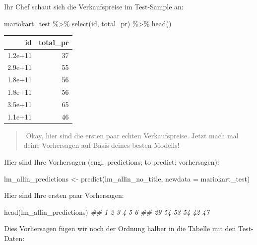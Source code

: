 \documentclass[
  letterpaper,
  twoside,
  open=any]{scrbook}
\newenvironment{Shaded}{\begin{snugshade}}{\end{snugshade}}
\newcommand{\AttributeTok}[1]{\textcolor[rgb]{0.40,0.45,0.13}{#1}}
\newcommand{\DocumentationTok}[1]{\textcolor[rgb]{0.37,0.37,0.37}{\textit{#1}}}
\newcommand{\FunctionTok}[1]{\textcolor[rgb]{0.28,0.35,0.67}{#1}}
\newcommand{\NormalTok}[1]{\textcolor[rgb]{0.00,0.23,0.31}{#1}}
\newcommand{\OtherTok}[1]{\textcolor[rgb]{0.00,0.23,0.31}{#1}}
\newcommand{\SpecialCharTok}[1]{\textcolor[rgb]{0.37,0.37,0.37}{#1}}
\theoremstyle{definition}
\theoremstyle{definition}
\theoremstyle{definition}
\theoremstyle{remark}
\begin{document}
Ihr Chef schaut sich die Verkaufspreise im Test-Sample an:

\begin{Shaded}
\begin{Highlighting}[]
\NormalTok{mariokart\_test }\SpecialCharTok{\%\textgreater{}\%} 
  \FunctionTok{select}\NormalTok{(id, total\_pr) }\SpecialCharTok{\%\textgreater{}\%} 
  \FunctionTok{head}\NormalTok{()}
\end{Highlighting}
\end{Shaded}

\begin{longtable}[]{@{}rr@{}}
\toprule\noalign{}
id & total\_pr \\
\midrule\noalign{}
\endhead
\bottomrule\noalign{}
\endlastfoot
1.2e+11 & 37 \\
2.9e+11 & 55 \\
1.8e+11 & 56 \\
1.8e+11 & 56 \\
3.5e+11 & 65 \\
1.1e+11 & 46 \\
\end{longtable}

\begin{quote}
{}️ Okay, hier sind die ersten paar echten Verkaufspreise.
Jetzt mach mal deine Vorhersagen auf Basis deines besten Modells!
\end{quote}

Hier sind Ihre Vorhersagen (engl. predictions; to predict: vorhersagen):

\begin{Shaded}
\begin{Highlighting}[]
\NormalTok{lm\_allin\_predictions }\OtherTok{\textless{}{-}} \FunctionTok{predict}\NormalTok{(lm\_allin\_no\_title, }\AttributeTok{newdata =}\NormalTok{ mariokart\_test)}
\end{Highlighting}
\end{Shaded}

Hier sind Ihre ersten paar Vorhersagen:

\begin{Shaded}
\begin{Highlighting}[]
\FunctionTok{head}\NormalTok{(lm\_allin\_predictions)}
\DocumentationTok{\#\#  1  2  3  4  5  6 }
\DocumentationTok{\#\# 29 54 53 54 42 47}
\end{Highlighting}
\end{Shaded}

Dies Vorhersagen fügen wir noch der Ordnung halber in die Tabelle mit
den Test-Daten:
\end{document}
